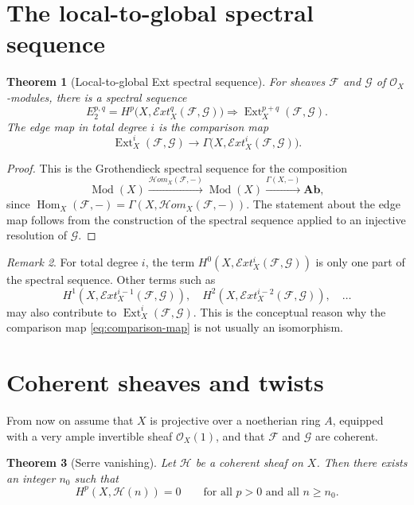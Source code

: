 \documentclass[11pt,a4paper]{article}
\numberwithin{equation}{section}
\theoremstyle{plain}
\newtheorem{theorem}{Theorem}[section]
\theoremstyle{definition}
\theoremstyle{remark}
\newtheorem{remark}[theorem]{Remark}
\newcommand{\OO}{\mathcal O}
\newcommand{\F}{\mathcal F}
\newcommand{\G}{\mathcal G}
\newcommand{\HH}{\mathcal H}
\DeclareMathOperator{\Ext}{Ext}
\DeclareMathOperator{\Hom}{Hom}
\newcommand{\sExt}{\mathcal{E}\!xt}
\newcommand{\sHom}{\mathcal{H}\!om}
\newcommand{\Mod}{\operatorname{Mod}}
\begin{document}
\section{The local-to-global spectral sequence}

\begin{theorem}[Local-to-global Ext spectral sequence]\label{thm:local-to-global}
For sheaves \(\F\) and \(\G\) of \(\OO_X\)-modules, there is a spectral sequence
\[
  E_2^{p,q}=H^p\bigl(X,\sExt_X^q(\F,\G)\bigr)
  \Longrightarrow
  \Ext_X^{p+q}(\F,\G).
\]
The edge map in total degree \(i\) is the comparison map
\[
  \Ext_X^i(\F,\G)
  \longrightarrow
  \Gamma\bigl(X,\sExt_X^i(\F,\G)\bigr).
\]
\end{theorem}

\begin{proof}
This is the Grothendieck spectral sequence for the composition
\[
  \Mod(X)
  \xrightarrow{\sHom_X(\F,-)}
  \Mod(X)
  \xrightarrow{\Gamma(X,-)}
  \mathbf{Ab},
\]
since \(\Hom_X(\F,-)=\Gamma(X,\sHom_X(\F,-))\).  The statement about the edge map follows from the construction of the spectral sequence applied to an injective resolution of \(\G\).
\end{proof}

\begin{remark}
For total degree \(i\), the term \(H^0(X,\sExt_X^i(\F,\G))\) is only one part of the spectral sequence.  Other terms such as
\[
  H^1(X,\sExt_X^{i-1}(\F,\G)),\quad
  H^2(X,\sExt_X^{i-2}(\F,\G)),\quad \ldots
\]
may also contribute to \(\Ext_X^i(\F,\G)\).  This is the conceptual reason why the comparison map \eqref{eq:comparison-map} is not usually an isomorphism.
\end{remark}

\section{Coherent sheaves and twists}

From now on assume that \(X\) is projective over a noetherian ring \(A\), equipped with a very ample invertible sheaf \(\OO_X(1)\), and that \(\F\) and \(\G\) are coherent.

\begin{theorem}[Serre vanishing]\label{thm:serre-vanishing}
Let \(\HH\) be a coherent sheaf on \(X\).  Then there exists an integer \(n_0\) such that
\[
  H^p(X,\HH(n))=0
  \qquad
  \text{for all }p>0\text{ and all }n\ge n_0.
\]
\end{theorem}
\end{document}
